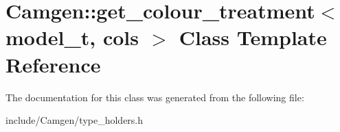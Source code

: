 \hypertarget{a00244}{}\section{Camgen\+:\+:get\+\_\+colour\+\_\+treatment$<$ model\+\_\+t, cols $>$ Class Template Reference}
\label{a00244}


The documentation for this class was generated from the following file\+:\begin{DoxyCompactItemize}
\item 
include/\+Camgen/type\+\_\+holders.\+h\end{DoxyCompactItemize}
